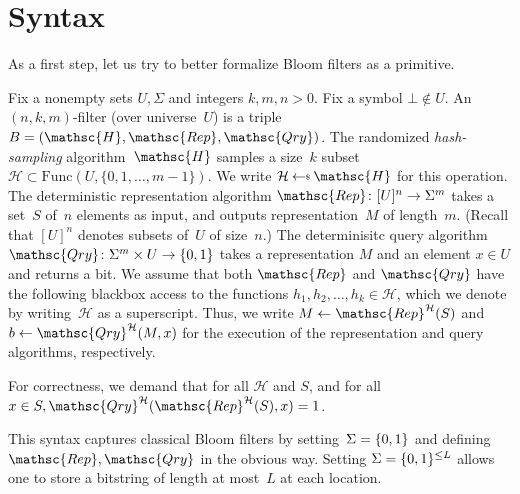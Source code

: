 \section{Syntax}
As a first step, let us try to better formalize Bloom filters as a primitive.

Fix a nonempty sets $U,\Sigma$ and integers $k,m,n>0$.  Fix a symbol $\bot \not\in U$.  An $(n,k,m)$-filter (over universe~$U$) is a triple  $B=(\mathsc{H},\mathsc{Rep},\mathsc{Qry})$.   
%
The randomized \emph{hash-sampling} algorithm~$\mathsc{H}$ samples a size~$k$ subset~$\mathcal{H} \subset \mathrm{Func}(U,\{0,1,\ldots,m-1\})$.  We write $\mathcal{H} \getsr \mathsc{H}$ for this operation.
%
The deterministic representation algorithm $\mathsc{Rep}\colon [U]^n \rightarrow \Sigma^m$ takes a set~$S$ of~$n$ elements as input, and outputs representation~$M$ of length~$m$.  (Recall that $[U]^n$ denotes subsets of~$U$ of size~$n$.)
%
The determinisitc query algorithm $\mathsc{Qry}\colon \Sigma^m \times U \rightarrow \bits$ takes a representation $M$ and an element $x \in U$ and returns a bit.  
%
We assume that both $\mathsc{Rep}$ and $\mathsc{Qry}$ have the following blackbox access to the functions $h_1,h_2,\ldots,h_k \in \mathcal{H}$, which we denote by writing~$\mathcal{H}$ as a superscript.   Thus, we write $M \gets \mathsc{Rep}^{\mathcal{H}}(S)$ and $b \gets \mathsc{Qry}^{\mathcal{H}}(M,x)$ for the execution of the representation and query algorithms, respectively.

For correctness, we demand that for all $\mathcal{H}$ and $S$, and for all $x \in S, \mathsc{Qry}^{\mathcal{H}}(\mathsc{Rep}^{\mathcal{H}}(S),x)=1$.  

This syntax captures classical Bloom filters by setting~$\Sigma=\{0,1\}$ and defining $\mathsc{Rep},\mathsc{Qry}$ in the obvious way.  Setting $\Sigma=\{0,1\}^{\leq L}$ allows one to store a bitstring of length at most~$L$ at each location. 


